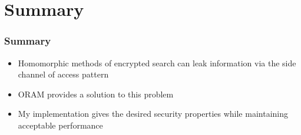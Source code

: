 \documentclass{beamer}
\begin{document}
\section{Summary}

\begin{frame}
    \frametitle{Summary}
    \begin{itemize}
        \item Homomorphic methods of encrypted search can leak information via the side channel of access pattern
        \item ORAM provides a solution to this problem
        \item My implementation gives the desired security properties while maintaining acceptable performance
    \end{itemize}
\end{frame}

\addtocounter{framenumber}{-1}

\end{document}
